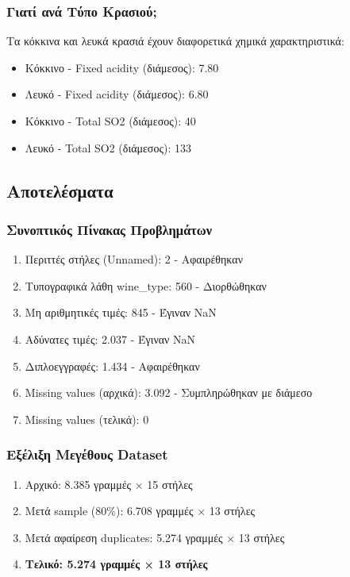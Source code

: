 \documentclass[12pt,a4paper]{article}
\begin{document}
\subsubsection{Γιατί ανά Τύπο Κρασιού;}

Τα κόκκινα και λευκά κρασιά έχουν διαφορετικά χημικά χαρακτηριστικά:

\begin{itemize}
    \item Κόκκινο - Fixed acidity (διάμεσος): 7.80
    \item Λευκό - Fixed acidity (διάμεσος): 6.80
    \item Κόκκινο - Total SO2 (διάμεσος): 40
    \item Λευκό - Total SO2 (διάμεσος): 133
\end{itemize}

\subsection{Αποτελέσματα}

\subsubsection{Συνοπτικός Πίνακας Προβλημάτων}

\begin{enumerate}
    \item Περιττές στήλες (Unnamed): 2 - Αφαιρέθηκαν
    \item Τυπογραφικά λάθη wine\_type: 560 - Διορθώθηκαν
    \item Μη αριθμητικές τιμές: 845 - Έγιναν NaN
    \item Αδύνατες τιμές: 2.037 - Έγιναν NaN
    \item Διπλοεγγραφές: 1.434 - Αφαιρέθηκαν
    \item Missing values (αρχικά): 3.092 - Συμπληρώθηκαν με διάμεσο
    \item Missing values (τελικά): 0
\end{enumerate}

\subsubsection{Εξέλιξη Μεγέθους Dataset}

\begin{enumerate}
    \item Αρχικό: 8.385 γραμμές × 15 στήλες
    \item Μετά sample (80\%): 6.708 γραμμές × 13 στήλες
    \item Μετά αφαίρεση duplicates: 5.274 γραμμές × 13 στήλες
    \item \textbf{Τελικό: 5.274 γραμμές × 13 στήλες}
\end{enumerate}
\end{document}
